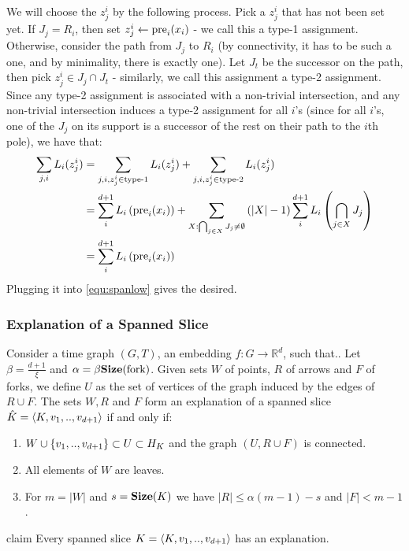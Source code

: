 \documentclass{beamer}
\begin{document}
\begin{frame}
We will choose the $z_{j}^{i}$ by the following process. Pick a $z_{j}^{i}$ that has not been set yet. If $J_{j} = R_{i}$, then set $z_{j}^{i} \leftarrow \text{pre}_{i}(x_{i})$ - we call this a type-1 assignment. Otherwise, consider the path from $J_{j}$ to $R_{i}$ (by connectivity, it has to be such a one, and by minimality, there is exactly one). Let $J_{t}$ be the successor on the path, then pick $z_{j}^{i} \in J_{j} \cap J_{t}$ - similarly, we call this assignment a type-2 assignment. Since any type-2 assignment is associated with a non-trivial intersection, and any non-trivial intersection induces a type-2 assignment for all $i$'s (since for all $i$'s, one of the $J_{j}$ on its support is a successor of the rest on their path to the $i$th pole), we have that:
    \begin{equation*}
      \begin{split}
        \sum_{j,i}L_{i}(z_{j}^{i}) &= \sum_{j,i, z_{j}^{i} \in \text{type-1}}L_{i}(z_{j}^{i}) + \sum_{j,i, z_{j}^{i} \in \text{type-2}}L_{i}(z_{j}^{i}) \\
        &= \sum_{i}^{d+1}L_{i}\left( \text{pre}_{i}(x_{i}) \right) + \sum_{X : \bigcap_{j\in X}J_{j} \neq \emptyset }\left(|X|-1\right) \sum_{i}^{d+1} L_{i}\left(\bigcap_{j\in X}J_{j} \right) \\ 
        &=\sum_{i}^{d+1}L_{i}\left( \text{pre}_{i}(x_{i}) \right) 
      \end{split}
    \end{equation*}
    Plugging it into \cref{equ:spanlow} gives the desired.
\end{frame}

 
\begin{frame}
  \frametitle{Explanation of a Spanned Slice} 
    Consider a time graph $(G,T)$, an embedding $f : G \rightarrow \mathbb{R}^{d}$, such that.. Let $\beta = \frac{d+1}{\xi}$ and $\alpha = \beta \mathbf{Size}(\text{fork})$. Given sets $W$ of points, $R$ of arrows and $F$ of forks, we define $U$ as the set of vertices of the graph induced by the edges of $R \cup F$. The sets $W,R$ and $F$ form an explanation of a spanned slice $\hat{K} = \braket{ K, v_{1}, .., v_{d+1}}$ if and only if: 
    \begin{enumerate}
      \item $W \cup \{v_{1} ,.., v_{d+1}\} \subset U \subset H_{K}$ and the graph $(U, R\cup F)$ is connected. 
      \item All elements of $W$ are leaves. 
      \item For $m = |W|$ and $s=\mathbf{Size}(K)$ we have $|R| \le \alpha (m-1) - s $ and $|F| < m -1 $. 
    \end{enumerate}

    \begin{block}{claim}
    \label{claim:edgesin}
    Every spanned slice $K = \braket{K,v_{1},..,v_{d+1}}$ has an explanation.
  \end{block}
\end{frame}
\end{document}
